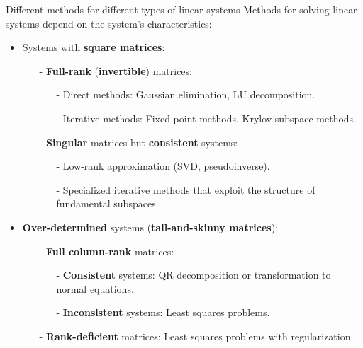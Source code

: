 \documentclass[t,usepdftitle=false]{beamer}
\begin{document}
\begin{frame}{Different methods for different types of linear systems}
Methods for solving linear systems depend on the system's characteristics:
\begin{itemize}
\item Systems with \textbf{square matrices}:\vspace{.03cm}
\begin{itemize}
\item[-] \textbf{Full-rank} (\textbf{invertible}) matrices:\vspace{.03cm}
\begin{itemize}
\item[-] Direct methods: Gaussian elimination, LU decomposition.\vspace{.03cm}
\item[-] Iterative methods: Fixed-point methods, Krylov subspace methods.\vspace{.03cm}
\end{itemize}
\item[-] \textbf{Singular} matrices but \textbf{consistent} systems:\vspace{.03cm}
\begin{itemize}
\item[-] Low-rank approximation (SVD, pseudoinverse).\vspace{.03cm}
\item[-] Specialized iterative methods that exploit the structure of fundamental subspaces.\vspace{.03cm}
\end{itemize}
\end{itemize}
\item \textbf{Over-determined} systems (\textbf{tall-and-skinny matrices}):\vspace{.03cm}
\begin{itemize}
\item[-] \textbf{Full column-rank} matrices:\vspace{.03cm}
\begin{itemize}
\item[-] \textbf{Consistent} systems: QR decomposition or transformation to normal equations.\vspace{.03cm}
\item[-] \textbf{Inconsistent} systems: Least squares problems.\vspace{.03cm}
\end{itemize}
\item[-] \textbf{Rank-deficient} matrices: Least squares problems with regularization.\vspace{.03cm}

\end{itemize}
\end{itemize}
\end{frame}
\end{document}
